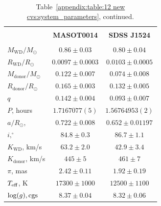 \begin{landscape}
    \begin{table}
        \centering
        \caption{Table~\ref{appendix:table:12 new cvs:system_parameters}, continued.}
        \label{appendix:table:12 new cvs:system_parameters cont 2}
        \begin{tabular}{lcc}
            \hline \\
            ~                          & \textbf{MASOT0014}     & \textbf{SDSS J1524} \\
            \hline \hline \\
            $M_\mathrm{WD}/M_\odot$    & $0.86\pm0.03$          & $0.80\pm0.04$ \\
            $R_\mathrm{WD}/R_\odot$    & $0.0097\pm0.0003$      & $0.0103\pm0.0005$ \\
            $M_\mathrm{donor}/M_\odot$ & $0.122\pm0.007$        & $0.074\pm0.008$ \\
            $R_\mathrm{donor}/R_\odot$ & $0.165\pm0.003$        & $0.132\pm0.005$ \\
            $q$                        & $0.142\pm0.004$        & $0.093\pm0.007$ \\
            \hline
            $P$, hours                 & $1.7167077(5)$         & $1.56764953(2)$ \\
            $a/R_\odot$,               & $0.722\pm0.008$        & $0.652\pm0.01197$ \\
            $i, ^\circ$                & $84.8\pm0.3$           & $86.7\pm1.1$ \\
            $K_\mathrm{WD}$, km/s      & $63.2\pm2.0$           & $42.9\pm3.4$ \\
            $K_\mathrm{donor}$, km/s   & $445\pm5$              & $461\pm7$ \\
            \hline
            $\pi$, mas                 & $2.42\pm0.11$          & $1.92\pm0.19$ \\
            $T_{\rm eff}$, K           & $17300\pm1000$         & $12500\pm1100$ \\
            $\log(g), {\rm cgs}$       & $8.37\pm0.04$          & $8.32\pm0.06$ \\
            \hline
            \hline
        \end{tabular}
    \end{table}



\end{landscape}
